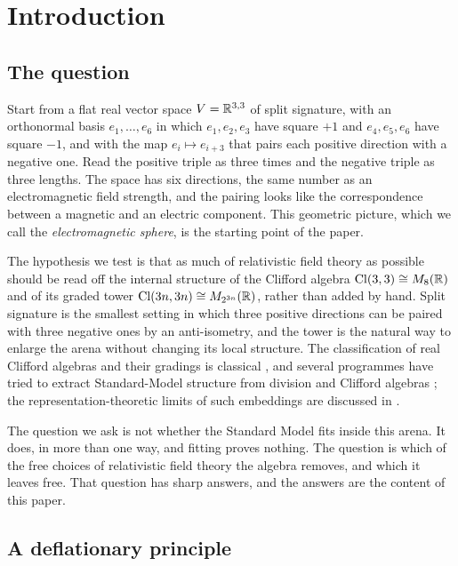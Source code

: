 \section{Introduction}
\label{sec:intro}

\subsection{The question}

Start from a flat real vector space $V=\mathbb{R}^{3,3}$ of split signature, with an orthonormal basis $e_1,\dots,e_6$ in which
$e_1,e_2,e_3$ have square $+1$ and $e_4,e_5,e_6$ have square $-1$, and with the map $e_i\mapsto e_{i+3}$ that pairs each
positive direction with a negative one. Read the positive triple as three times and the negative triple as three
lengths. The space has six directions, the same number as an electromagnetic field strength, and the pairing looks like
the correspondence between a magnetic and an electric component. This geometric picture, which we call the
\emph{electromagnetic sphere}, is the starting point of the paper.

The hypothesis we test is that as much of relativistic field theory as possible should be read off the internal
structure of the Clifford algebra $\mathrm{Cl}(3,3)\cong M_8(\mathbb{R})$ and of its graded tower $\mathrm{Cl}(3n,3n)\cong M_{2^{3n}}(\mathbb{R})$,
rather than added by hand. Split signature is the smallest setting in which three positive directions can be paired with
three negative ones by an anti-isometry, and the tower is the natural way to enlarge the arena without changing its
local structure. The classification of real Clifford algebras and their gradings is classical
\cite{LawsonMichelsohn,Lounesto,Porteous,MosnaMirallesVaz}, and several programmes have tried to extract Standard-Model
structure from division and Clifford algebras \cite{Furey,Gresnigt,ChamseddineConnes}; the representation-theoretic limits
of such embeddings are discussed in \cite{DistlerGaribaldi}.

The question we ask is not whether the Standard Model fits inside this arena. It does, in more than one way, and fitting
proves nothing. The question is which of the free choices of relativistic field theory the algebra removes, and which it
leaves free. That question has sharp answers, and the answers are the content of this paper.

\subsection{A deflationary principle}
\label{sec:deflation}

